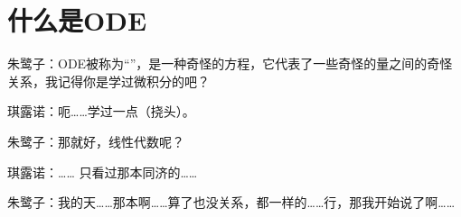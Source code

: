 \section{什么是ODE}
朱鹭子：ODE被称为“”，是一种奇怪的方程，它代表了一些奇怪的量之间的奇怪关系，我记得你是学过微积分的吧？

琪露诺：呃……学过一点（挠头）。

朱鹭子：那就好，线性代数呢？

琪露诺：…… 只看过那本同济的……

朱鹭子：我的天……那本啊……算了也没关系，都一样的……行，那我开始说了啊……